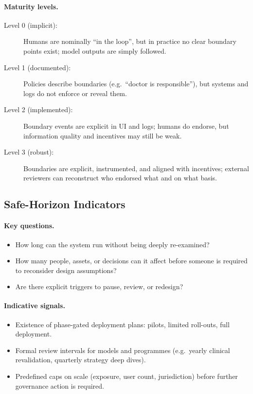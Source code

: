 \paragraph{Maturity levels.}

\begin{description}
  \item[Level 0 (implicit):]
    Humans are nominally ``in the loop'', but in practice no clear
    boundary points exist; model outputs are simply followed.
  \item[Level 1 (documented):]
    Policies describe boundaries (e.g.\ ``doctor is responsible''),
    but systems and logs do not enforce or reveal them.
  \item[Level 2 (implemented):]
    Boundary events are explicit in UI and logs; humans do endorse, but
    information quality and incentives may still be weak.
  \item[Level 3 (robust):]
    Boundaries are explicit, instrumented, and aligned with incentives;
    external reviewers can reconstruct who endorsed what and on what
    basis.
\end{description}

\subsection{Safe-Horizon Indicators}

\paragraph{Key questions.}

\begin{itemize}
  \item How long can the system run without being deeply re-examined?
  \item How many people, assets, or decisions can it affect before
        someone is required to reconsider design assumptions?
  \item Are there explicit triggers to pause, review, or redesign?
\end{itemize}

\paragraph{Indicative signals.}

\begin{itemize}
  \item Existence of phase-gated deployment plans:
        pilots, limited roll-outs, full deployment.
  \item Formal review intervals for models and programmes (e.g.\ yearly
        clinical revalidation, quarterly strategy deep dives).
  \item Predefined caps on scale (exposure, user count, jurisdiction)
        before further governance action is required.
\end{itemize}

